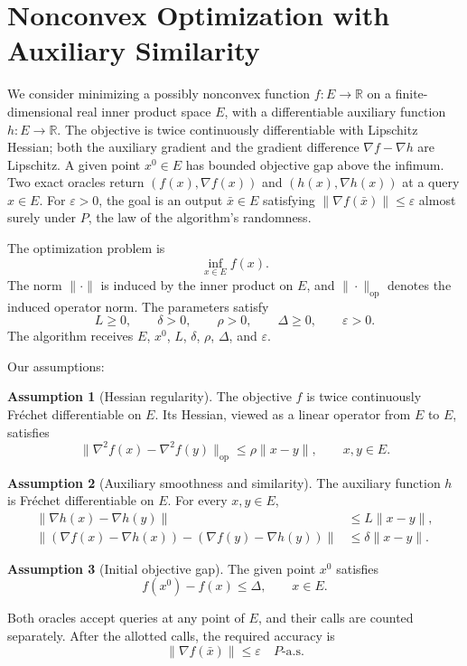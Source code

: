 \documentclass[10pt]{article}
\theoremstyle{definition}
\newtheorem{assumption}{Assumption}
\begin{document}
\section*{Nonconvex Optimization with Auxiliary Similarity}
We consider minimizing a possibly nonconvex function $f:E\to\mathbb{R}$ on a finite-dimensional real inner product space $E$, with a differentiable auxiliary function $h:E\to\mathbb{R}$. The objective is twice continuously differentiable with Lipschitz Hessian; both the auxiliary gradient and the gradient difference $\nabla f-\nabla h$ are Lipschitz. A given point $x^0\in E$ has bounded objective gap above the infimum. Two exact oracles return $(f(x),\nabla f(x))$ and $(h(x),\nabla h(x))$ at a query $x\in E$. For $\varepsilon>0$, the goal is an output $\bar{x}\in E$ satisfying $\|\nabla f(\bar{x})\|\leq\varepsilon$ almost surely under $P$, the law of the algorithm's randomness.

The optimization problem is
\[
\inf_{x\in E} f(x).
\]
The norm $\|\cdot\|$ is induced by the inner product on $E$, and $\|\cdot\|_{\mathrm{op}}$ denotes the induced operator norm. The parameters satisfy
\[
L\geq 0,\qquad \delta>0,\qquad \rho>0,\qquad
\Delta\geq 0,\qquad \varepsilon>0.
\]
The algorithm receives $E$, $x^0$, $L$, $\delta$, $\rho$, $\Delta$, and $\varepsilon$.

Our assumptions:
\begin{assumption}[Hessian regularity]
The objective $f$ is twice continuously Fr\'echet differentiable on $E$. Its Hessian, viewed as a linear operator from $E$ to $E$, satisfies
\[
\|\nabla^2 f(x)-\nabla^2 f(y)\|_{\mathrm{op}}
\leq \rho\|x-y\|,
\qquad x,y\in E.
\]
\end{assumption}

\begin{assumption}[Auxiliary smoothness and similarity]
The auxiliary function $h$ is Fr\'echet differentiable on $E$. For every $x,y\in E$,
\[
\begin{aligned}
\|\nabla h(x)-\nabla h(y)\|
&\leq L\|x-y\|,\\
\|(\nabla f(x)-\nabla h(x))
-(\nabla f(y)-\nabla h(y))\|
&\leq \delta\|x-y\|.
\end{aligned}
\]
\end{assumption}

\begin{assumption}[Initial objective gap]
The given point $x^0$ satisfies
\[
f(x^0)-f(x)\leq\Delta,
\qquad x\in E.
\]
\end{assumption}

Both oracles accept queries at any point of $E$, and their calls are counted separately. After the allotted calls, the required accuracy is
\[
\|\nabla f(\bar{x})\|\leq\varepsilon
\quad P\text{-a.s.}
\]
\end{document}
